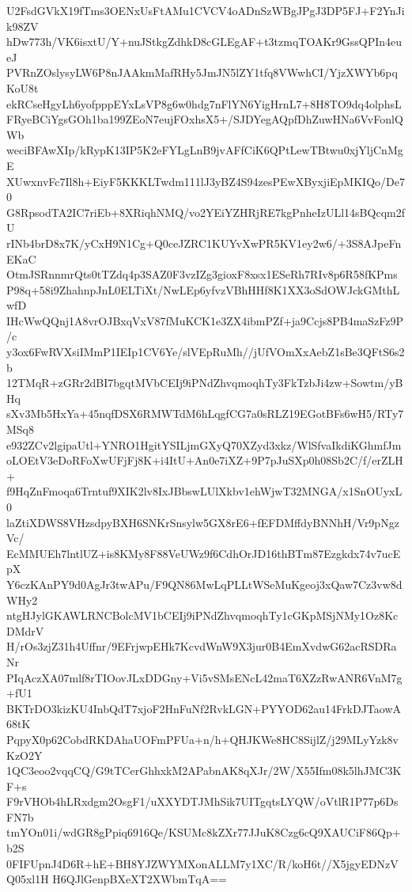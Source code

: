 U2FsdGVkX19fTms3OENxUsFtAMu1CVCV4oADnSzWBgJPgJ3DP5FJ+F2YnJik98ZV
hDw773h/VK6isxtU/Y+nuJStkgZdhkD8cGLEgAF+t3tzmqTOAKr9GssQPIn4eueJ
PVRnZOslysyLW6P8nJAAkmMafRHy5JmJN5lZY1tfq8VWwhCI/YjzXWYb6pqKoU8t
ekRCseHgyLh6yofpppEYxLsVP8g6w0hdg7nFlYN6YigHrnL7+8H8TO9dq4olphsL
FRyeBCiYgsGOh1ba199ZEoN7eujFOxhsX5+/SJDYegAQpfDhZuwHNa6VvFonlQWb
weciBFAwXIp/kRypK13IP5K2eFYLgLnB9jvAFfCiK6QPtLewTBtwu0xjYljCnMgE
XUwxnvFc7Il8h+EiyF5KKKLTwdm111lJ3yBZ4S94zesPEwXByxjiEpMKIQo/De70
G8RpsodTA2IC7riEb+8XRiqhNMQ/vo2YEiYZHRjRE7kgPnheIzULl14sBQcqm2fU
rINb4brD8x7K/yCxH9N1Cg+Q0ceJZRC1KUYvXwPR5KV1ey2w6/+3S8AJpeFnEKaC
OtmJSRnnmrQts0tTZdq4p3SAZ0F3vzIZg3gioxF8xsx1ESeRh7RIv8p6R58fKPms
P98q+58i9ZhahnpJnL0ELTiXt/NwLEp6yfvzVBhHHf8K1XX3oSdOWJckGMthLwfD
IHcWwQQnj1A8vrOJBxqVxV87fMuKCK1e3ZX4ibmPZf+ja9Ccjs8PB4maSzFz9P/c
y3ox6FwRVXsiIMmP1IEIp1CV6Ye/slVEpRuMh//jUfVOmXxAebZ1sBe3QFtS6s2b
12TMqR+zGRr2dBI7bgqtMVbCEIj9iPNdZhvqmoqhTy3FkTzbJi4zw+Sowtm/yBHq
sXv3Mb5HxYa+45nqfDSX6RMWTdM6hLqgfCG7a0sRLZ19EGotBFs6wH5/RTy7MSq8
e932ZCv2lgipaUtl+YNRO1HgitYSILjmGXyQ70XZyd3xkz/WlSfvaIkdiKGhmfJm
oLOEtV3eDoRFoXwUFjFj8K+i4ItU+An0e7iXZ+9P7pJuSXp0h08Sb2C/f/erZLH+
f9HqZnFmoqa6Trntuf9XIK2lv8IxJBbswLUlXkbv1ehWjwT32MNGA/x1SnOUyxL0
laZtiXDWS8VHzsdpyBXH6SNKrSnsylw5GX8rE6+fEFDMffdyBNNhH/Vr9pNgzVc/
EcMMUEh7lntlUZ+is8KMy8F88VeUWz9f6CdhOrJD16thBTm87Ezgkdx74v7ucEpX
Y6czKAnPY9d0AgJr3twAPu/F9QN86MwLqPLLtWSeMuKgeoj3xQaw7Cz3vw8dWHy2
ntgHJylGKAWLRNCBolcMV1bCEIj9iPNdZhvqmoqhTy1cGKpMSjNMy1Oz8KcDMdrV
H/rOs3zjZ31h4Uffnr/9EFrjwpEHk7KcvdWnW9X3jur0B4EmXvdwG62acRSDRaNr
PIqAczXA07mlf8rTIOovJLxDDGny+Vi5vSMsENcL42maT6XZzRwANR6VnM7g+fU1
BKTrDO3kizKU4InbQdT7xjoF2HnFuNf2RvkLGN+PYYOD62au14FrkDJTaowA68tK
PqpyX0p62CobdRKDAhaUOFmPFUa+n/h+QHJKWe8HC8SijlZ/j29MLyYzk8vKzO2Y
1QC3eoo2vqqCQ/G9tTCerGhhxkM2APabnAK8qXJr/2W/X55Ifm08k5lhJMC3KF+s
F9rVHOb4hLRxdgm2OsgF1/uXXYDTJMhSik7UITgqtsLYQW/oVtlR1P77p6DsFN7b
tmYOn01i/wdGR8gPpiq6916Qe/KSUMc8kZXr77JJuK8Czg6cQ9XAUCiF86Qp+b2S
0FIFUpnJ4D6R+hE+BH8YJZWYMXonALLM7y1XC/R/koH6t//X5jgyEDNzVQ05xl1H
H6QJlGenpBXeXT2XWbmTqA==
